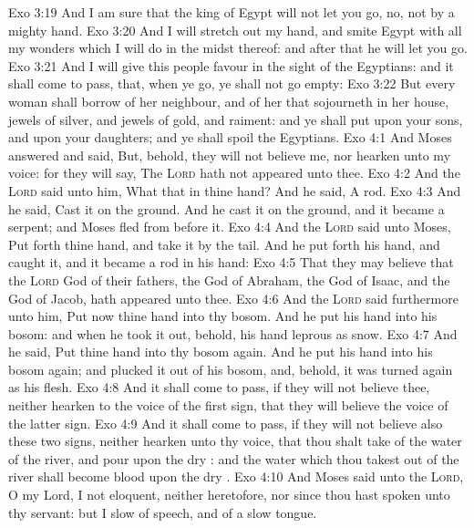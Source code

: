 \vs Exo 3:19 And I am sure that the king of Egypt will not let you go, no, not by a mighty hand.
\vs Exo 3:20 And I will stretch out my hand, and smite Egypt with all my wonders which I will do in the midst thereof: and after that he will let you go.
\vs Exo 3:21 And I will give this people favour in the sight of the Egyptians: and it shall come to pass, that, when ye go, ye shall not go empty:
\vs Exo 3:22 But every woman shall borrow of her neighbour, and of her that sojourneth in her house, jewels of silver, and jewels of gold, and raiment: and ye shall put  upon your sons, and upon your daughters; and ye shall spoil the Egyptians.
\vs Exo 4:1 And Moses answered and said, But, behold, they will not believe me, nor hearken unto my voice: for they will say, The \textsc{Lord} hath not appeared unto thee.
\vs Exo 4:2 And the \textsc{Lord} said unto him, What  that in thine hand? And he said, A rod.
\vs Exo 4:3 And he said, Cast it on the ground. And he cast it on the ground, and it became a serpent; and Moses fled from before it.
\vs Exo 4:4 And the \textsc{Lord} said unto Moses, Put forth thine hand, and take it by the tail. And he put forth his hand, and caught it, and it became a rod in his hand:
\vs Exo 4:5 That they may believe that the \textsc{Lord} God of their fathers, the God of Abraham, the God of Isaac, and the God of Jacob, hath appeared unto thee.
\vs Exo 4:6 And the \textsc{Lord} said furthermore unto him, Put now thine hand into thy bosom. And he put his hand into his bosom: and when he took it out, behold, his hand  leprous as snow.
\vs Exo 4:7 And he said, Put thine hand into thy bosom again. And he put his hand into his bosom again; and plucked it out of his bosom, and, behold, it was turned again as his  flesh.
\vs Exo 4:8 And it shall come to pass, if they will not believe thee, neither hearken to the voice of the first sign, that they will believe the voice of the latter sign.
\vs Exo 4:9 And it shall come to pass, if they will not believe also these two signs, neither hearken unto thy voice, that thou shalt take of the water of the river, and pour  upon the dry : and the water which thou takest out of the river shall become blood upon the dry .
\vs Exo 4:10 And Moses said unto the \textsc{Lord}, O my Lord, I  not eloquent, neither heretofore, nor since thou hast spoken unto thy servant: but I  slow of speech, and of a slow tongue.

